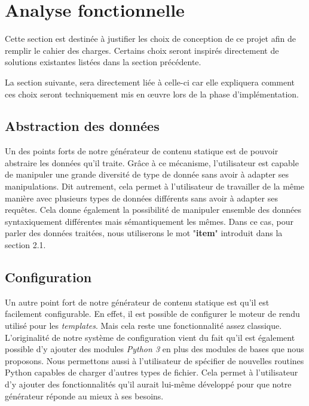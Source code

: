 \section{Analyse fonctionnelle}

	Cette section est destinée à justifier les choix de conception de ce projet afin de remplir le cahier des charges. Certains choix seront inspirés directement de solutions existantes listées dans la section précédente.
	
	La section suivante, sera directement liée à celle-ci car elle expliquera comment ces choix seront techniquement mis en œuvre lors de la phase d'implémentation.
	
	\subsection{Abstraction des données}
		Un des points forts de notre générateur de contenu statique est de pouvoir abstraire les données qu'il traite. Grâce à ce mécanisme, l'utilisateur est capable de manipuler une grande diversité de type de donnée sans avoir à adapter ses manipulations. Dit autrement, cela permet à l'utilisateur de travailler de la même manière avec plusieurs types de données différents sans avoir à adapter ses requêtes. Cela donne également la possibilité de manipuler ensemble des données  syntaxiquement différentes mais sémantiquement les mêmes. Dans ce cas, pour parler des données traitées, nous utiliserons le mot "\textbf{item}" introduit dans la section 2.1.
		
	\subsection{Configuration}
		Un autre point fort de notre générateur de contenu statique est qu'il est facilement configurable. En effet, il est possible de configurer le moteur de rendu utilisé pour les \textit{templates}. Mais cela reste une fonctionnalité assez classique. L'originalité de notre système de configuration vient du fait qu'il est également possible d'y ajouter des modules \textit{Python 3} en plus des modules de bases que nous proposons. Nous permettons aussi à l'utilisateur de spécifier de nouvelles routines Python capables de charger d'autres types de fichier. Cela permet à l'utilisateur d'y ajouter des fonctionnalités qu'il aurait lui-même développé pour que notre générateur réponde au mieux à ses besoins.
		

